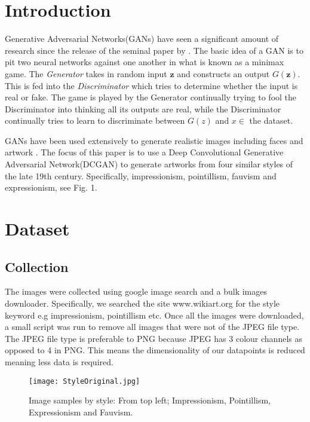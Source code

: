 \documentclass[conference]{IEEEtran}
\begin{document}




%
\IEEEpeerreviewmaketitle



\section{Introduction}

Generative Adversarial Networks(GANs) have seen a significant amount of research since the release of the seminal paper by \cite{goodfellow2014generative}. The basic idea of a GAN is to pit two neural networks against one another in what is known as a minimax game. The \emph{Generator} takes in random input $\boldsymbol{z}$ and constructs an output  $G(\boldsymbol{z})$. This is fed into the \emph{Discriminator} which tries to determine whether the input is real or fake. The game is played by the Generator continually trying to fool the Discriminator into thinking all its outputs are real, while the Discriminator continually tries to learn to discriminate between $G(z)$ and $x \in$ the dataset. 

GANs have been used extensively to generate realistic images including faces \cite{gauthier2014conditional} and artwork \cite{tan2017artgan}. The focus of this paper is to use a Deep Convolutional Generative Adversarial Network(DCGAN) to generate artworks from four similar styles of the late 19th century. Specifically, impressionism, pointillism, fauvism and expressionism, see Fig. 1. 



\section{Dataset}

\subsection{Collection}

The images were collected using google image search and a bulk images downloader. Specifically, we searched the site www.wikiart.org for the style keyword e.g impressionism, pointillism etc. Once all the images were downloaded, a small script was run to remove all images that were not of the JPEG file type. The JPEG file type is preferable to PNG because JPEG has 3 colour channels as opposed to 4 in PNG. This means the dimensionality of our datapoints is reduced meaning less data is required.
\begin{figure}
    \centering
\texttt{[image: StyleOriginal.jpg]}
\caption{Image samples by style: From top left;  Impressionism, Pointillism, Expressionism and Fauvism.}

\end{figure}
\end{document}
